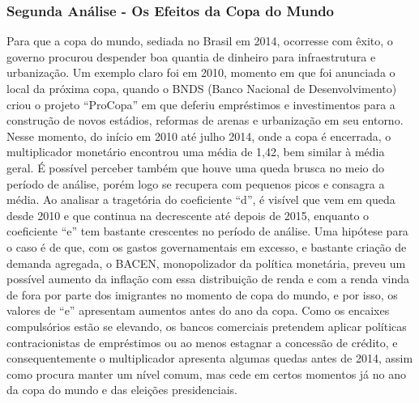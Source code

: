 \documentclass[12pt]{article}
\begin{document}
\subsubsection*{Segunda Análise - Os Efeitos da Copa do Mundo}

Para que a copa do mundo, sediada no Brasil em 2014, ocorresse com
êxito, o governo procurou despender boa quantia de dinheiro para
infraestrutura e urbanização. Um exemplo claro foi em 2010, momento em
que foi anunciada o local da próxima copa, quando o BNDS (Banco Nacional
de Desenvolvimento) criou o projeto ``ProCopa'' em que deferiu
empréstimos e investimentos para a construção de novos estádios,
reformas de arenas e urbanização em seu entorno. Nesse momento, do
início em 2010 até julho 2014, onde a copa é encerrada, o multiplicador
monetário encontrou uma média de 1,42, bem similar à média geral. É
possível perceber também que houve uma queda brusca no meio do período
de análise, porém logo se recupera com pequenos picos e consagra a
média. Ao analisar a tragetória do coeficiente ``d'', é visível que vem
em queda desde 2010 e que continua na decrescente até depois de 2015,
enquanto o coeficiente ``e'' tem bastante crescentes no período de
análise. Uma hipótese para o caso é de que, com os gastos governamentais
em excesso, e bastante criação de demanda agregada, o BACEN,
monopolizador da política monetária, preveu um possível aumento da
inflação com essa distribuição de renda e com a renda vinda de fora por
parte dos imigrantes no momento de copa do mundo, e por isso, os valores
de ``e'' apresentam aumentos antes do ano da copa. Como os encaixes
compulsórios estão se elevando, os bancos comerciais pretendem aplicar
políticas contracionistas de empréstimos ou ao menos estagnar a
concessão de crédito, e consequentemente o multiplicador apresenta
algumas quedas antes de 2014, assim como procura manter um nível comum,
mas cede em certos momentos já no ano da copa do mundo e das eleições
presidenciais.

\begingroup\fontsize{10}{12}\selectfont
\end{document}
